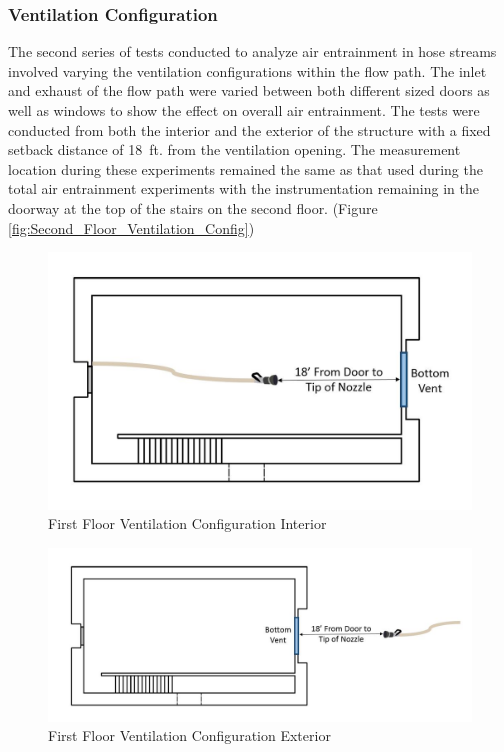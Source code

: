 \documentclass{article}
\begin{document}
\clearpage

\subsubsection{Ventilation Configuration}

The second series of tests conducted to analyze air entrainment in hose streams involved varying the ventilation configurations within the flow path. The inlet and exhaust of the flow path were varied between both different sized doors as well as windows to show the effect on overall air entrainment. The tests were conducted from both the interior and the exterior of the structure with a fixed setback distance of 18~ft. from the ventilation opening. The measurement location during these experiments remained the same as that used during the total air entrainment experiments with the instrumentation remaining in the doorway at the top of the stairs on the second floor. (Figure \ref{fig:Second_Floor_Ventilation_Config})

\begin{figure}[!ht]
	\centering
	\includegraphics[width=5in]{Figures/Air_Entrainment/Measurement_Location_VentConfig_Bottom.jpg}
	\caption{First Floor Ventilation Configuration Interior}
	\label{fig:First_Floor_Ventilation_Configuration_Interior}
\end{figure}

\begin{figure}[!ht]
	\centering
	\includegraphics[width=6.5in]{Figures/Air_Entrainment/Measurement_Location_VentConfig_Bottom_Ext.jpg}
	\caption{First Floor Ventilation Configuration Exterior}
	\label{fig:First_Floor_Ventilation_Configuration_Exterior}
\end{figure}
\end{document}
